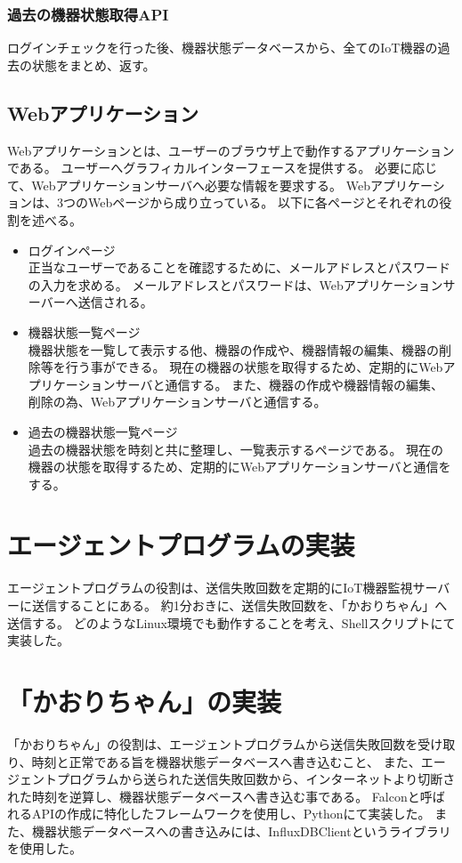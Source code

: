 \subsubsection{過去の機器状態取得API}
ログインチェックを行った後、機器状態データベースから、全てのIoT機器の過去の状態をまとめ、返す。

\subsection{Webアプリケーション}
Webアプリケーションとは、ユーザーのブラウザ上で動作するアプリケーションである。
ユーザーへグラフィカルインターフェースを提供する。
必要に応じて、Webアプリケーションサーバへ必要な情報を要求する。
Webアプリケーションは、3つのWebページから成り立っている。
以下に各ページとそれぞれの役割を述べる。
\begin{itemize}
	\item ログインページ\\
		正当なユーザーであることを確認するために、メールアドレスとパスワードの入力を求める。
		メールアドレスとパスワードは、Webアプリケーションサーバーへ送信される。
	\item 機器状態一覧ページ\\
		機器状態を一覧して表示する他、機器の作成や、機器情報の編集、機器の削除等を行う事ができる。
		現在の機器の状態を取得するため、定期的にWebアプリケーションサーバと通信する。
		また、機器の作成や機器情報の編集、削除の為、Webアプリケーションサーバと通信する。
	\item 過去の機器状態一覧ページ\\
		過去の機器状態を時刻と共に整理し、一覧表示するページである。
		現在の機器の状態を取得するため、定期的にWebアプリケーションサーバと通信をする。
\end{itemize}

\section{エージェントプログラムの実装}
エージェントプログラムの役割は、送信失敗回数を定期的にIoT機器監視サーバーに送信することにある。
約1分おきに、送信失敗回数を、「かおりちゃん」へ送信する。
どのようなLinux環境でも動作することを考え、Shellスクリプトにて実装した。

\section{「かおりちゃん」の実装}
「かおりちゃん」の役割は、エージェントプログラムから送信失敗回数を受け取り、時刻と正常である旨を機器状態データベースへ書き込むこと、
また、エージェントプログラムから送られた送信失敗回数から、インターネットより切断された時刻を逆算し、機器状態データベースへ書き込む事である。
Falconと呼ばれるAPIの作成に特化したフレームワークを使用し、Pythonにて実装した。
また、機器状態データベースへの書き込みには、InfluxDBClientというライブラリを使用した。

